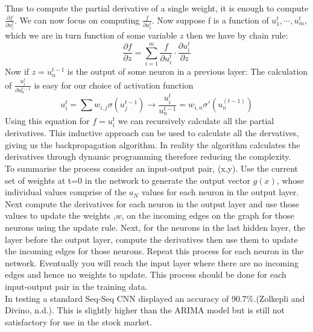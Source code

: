 \documentclass{article}
\begin{document}
Thus to compute the partial derivative of a single weight, it is enough to compute $\frac{\partial f}{\partial u_i^t}$.
We can now focus on computing $\frac{f}{\partial u_i^t}$. Now suppose f is a function of $u_1^t, \cdots, u_m^t$, which we are in turn function of some variable $z$ then we have by chain rule:
$$\frac{\partial f}{\partial z} = \sum_{i=1}^{m}\frac{f}{\partial u_i^t}\cdot \frac{\partial u_i^t}{\partial z}$$
Now if $z = u_n^{t-1}$ is the output of some neuron in a previous layer: The calculation of $\frac{u_i^t}{\partial u_n^{t-1}}$ is easy for our choice of activation function
$$u_i^t = \sum w_{i,j}\sigma(u_j^{t-1}) \rightarrow \frac{u_i^t}{u_n^{t-1}} = w_{i,n}\sigma'(u_n^(t-1))$$
Using this equation for $f= u_i^t$ we can recursively calculate all the partial derivatives. This inductive approach can be used to calculate all the dervatives, giving us the backpropagation algorithm. In reality the algorithm calculates the derivatives through dynamic programming therefore reducing the complexity.\\
To summarise the process consider an input-output pair, (x,y). Use the current set of weights at
t=0 in the network to generate the output vector $g(x)$, whose individual values comprise of the $a_N$
values for each neuron in the output layer. Next compute the derivatives for each neuron in the
output layer and use those values to update the weights ,$w$, on the incoming edges on the graph
for those neurons using the update rule. Next, for the neurons in the last hidden layer, the layer
before the output layer, compute the derivatives then use them to update the incoming edges for
those neurons. Repeat this process for each neuron in the network. Eventually you will reach the
input layer where there are no incoming edges and hence no weights to update.
This process should be done for each input-output pair in the training data.\\
In testing a standard Seq-Seq CNN displayed an accuracy of 90.7\%.(Zolkepli and Divino, n.d.).
This is slightly higher than the ARIMA model but is still not satisfactory for use in the stock
market.
\end{document}
